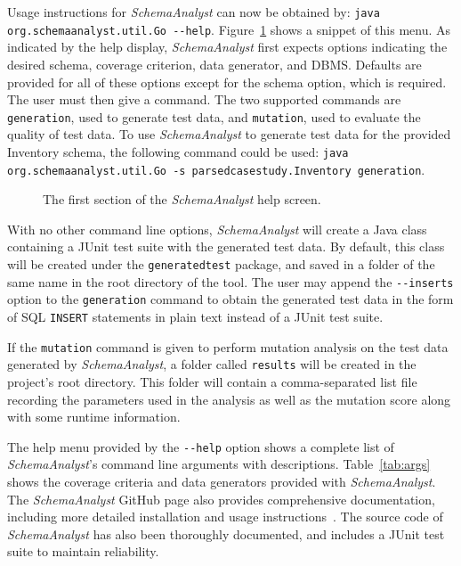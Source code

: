 Usage instructions for \textit{SchemaAnalyst} can now be obtained by: 
\lstinline{java org.schemaanalyst.util.Go --help}. Figure~\ref{fig:usage} shows a snippet of this menu.
As indicated by the help display, \textit{SchemaAnalyst} first expects options indicating the desired
schema, coverage criterion, data generator, and DBMS. Defaults are provided for all of these options
except for the schema option, which is required. The user must then give a command.  The two supported
commands are \lstinline{generation}, used to generate test data, and \lstinline{mutation}, used to
evaluate the quality of test data.
To use \textit{SchemaAnalyst} to generate test data for the provided Inventory schema, the following
command could be used: 
\lstinline{java org.schemaanalyst.util.Go -s parsedcasestudy.Inventory generation}.

\begin{figure}

\caption{\label{fig:usage} The first section of the \textit{SchemaAnalyst} help screen.}
\end{figure}

With no other command line options, \textit{SchemaAnalyst} will create a Java class containing a JUnit test
suite with the generated test data. By default, this class will be created under the \texttt{generatedtest}
package, and saved in a folder of the same name in the root directory of the tool.
The user may append the \lstinline{--inserts} option to the \lstinline{generation} command to obtain the
generated test data in the form of SQL \texttt{INSERT} statements in plain text instead of a JUnit test suite.

If the \lstinline{mutation} command is given to perform mutation analysis on the test data generated by
\textit{SchemaAnalyst}, a folder called \lstinline{results} will be created in the project's root directory.
This folder will contain a comma-separated list file recording the parameters used in the analysis as well
as the mutation score along with some runtime information.

The help menu provided by the \lstinline{--help} option shows a complete list of \textit{SchemaAnalyst}'s
command line arguments with descriptions. Table~\ref{tab:args} shows the coverage criteria and data generators
provided with \textit{SchemaAnalyst}. The \textit{SchemaAnalyst} GitHub page also provides comprehensive
documentation, including more detailed installation and usage instructions~\cite{tool}. The source code of
\textit{SchemaAnalyst} has also been thoroughly documented, and 
includes a JUnit test suite to maintain reliability.

